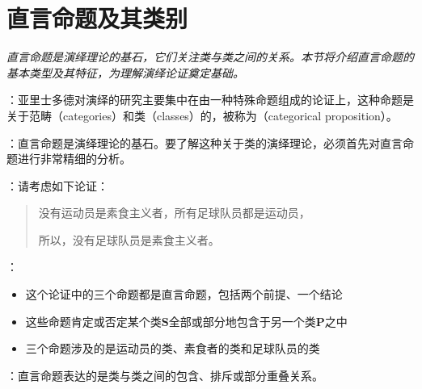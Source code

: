 \section{直言命题及其类别}

\begin{logicbox}[title=引言]
\textit{直言命题是演绎理论的基石，它们关注类与类之间的关系。本节将介绍直言命题的基本类型及其特征，为理解演绎论证奠定基础。}
\end{logicbox}

\begin{theorembox}[title=直言命题的基本概念]
：亚里士多德对演绎的研究主要集中在由一种特殊命题组成的论证上，这种命题是关于范畴（categories）和类（classes）的，被称为（categorical proposition）。

：直言命题是演绎理论的基石。要了解这种关于类的演绎理论，必须首先对直言命题进行非常精细的分析。

：请考虑如下论证：

\begin{quote}
没有运动员是素食主义者，所有足球队员都是运动员，

所以，没有足球队员是素食主义者。
\end{quote}

：
\begin{itemize}
  \item 这个论证中的三个命题都是直言命题，包括两个前提、一个结论
  \item 这些命题肯定或否定某个类$\boldsymbol{S}$全部或部分地包含于另一个类$\boldsymbol{P}$之中
  \item 三个命题涉及的是运动员的类、素食者的类和足球队员的类
\end{itemize}

：直言命题表达的是类与类之间的包含、排斥或部分重叠关系。
\end{theorembox}

